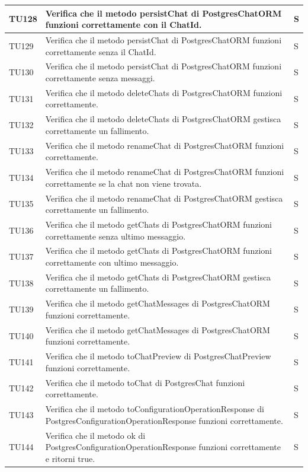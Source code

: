 \documentclass[10pt, a4paper]{article}
\begin{document}
\begin{xltabular}{\textwidth}{p{0.12\textwidth}|p{0.7\textwidth}|X}
\hline
TU128 & Verifica che il metodo persistChat di PostgresChatORM funzioni correttamente con il ChatId. & S \\
\hline
TU129 & Verifica che il metodo persistChat di PostgresChatORM funzioni correttamente senza il ChatId. & S \\
\hline
TU130 & Verifica che il metodo persistChat di PostgresChatORM funzioni correttamente senza messaggi. & S \\
\hline
TU131 & Verifica che il metodo deleteChats di PostgresChatORM funzioni correttamente. & S \\
\hline
TU132 & Verifica che il metodo deleteChats di PostgresChatORM gestisca correttamente un fallimento. & S \\
\hline
TU133 & Verifica che il metodo renameChat di PostgresChatORM funzioni correttamente. & S \\
\hline
TU134 & Verifica che il metodo renameChat di PostgresChatORM funzioni correttamente se la chat non viene trovata. & S \\
\hline
TU135 & Verifica che il metodo renameChat di PostgresChatORM gestisca correttamente un fallimento. & S \\
\hline
TU136 & Verifica che il metodo getChats di PostgresChatORM funzioni correttamente senza ultimo messaggio. & S \\
\hline
TU137 & Verifica che il metodo getChats di PostgresChatORM funzioni correttamente con ultimo messaggio. & S \\
\hline
TU138 & Verifica che il metodo getChats di PostgresChatORM gestisca correttamente un fallimento. & S \\
\hline
TU139 & Verifica che il metodo getChatMessages di PostgresChatORM funzioni correttamente. & S \\
\hline
TU140 & Verifica che il metodo getChatMessages di PostgresChatORM funzioni correttamente. & S \\
\hline
TU141 & Verifica che il metodo toChatPreview di PostgresChatPreview funzioni correttamente. & S \\
\hline
TU142 & Verifica che il metodo toChat di PostgresChat funzioni correttamente. & S \\
\hline
TU143 & Verifica che il metodo toConfigurationOperationResponse di PostgresConfigurationOperationResponse funzioni correttamente. & S \\
\hline
TU144 & Verifica che il metodo ok di PostgresConfigurationOperationResponse funzioni correttamente e ritorni true. & S \\

\end{xltabular}
\end{document}

